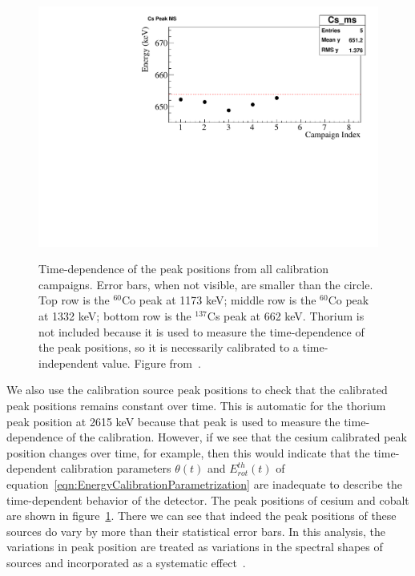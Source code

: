 \begin{figure}
\begin{center}
\includegraphics[keepaspectratio=true,width=.49\textwidth]{Cs_ms.pdf}
\end{center}
\renewcommand{\baselinestretch}{1}
\small\normalsize
\begin{quote}
\caption{Time-dependence of the peak positions from all calibration campaigns.  Error bars, when not visible, are smaller than the circle.  Top row is the $^{60}$Co peak at 1173 keV; middle row is the $^{60}$Co peak at 1332 keV; bottom row is the $^{137}$Cs peak at 662 keV.  Thorium is not included because it is used to measure the time-dependence of the peak positions, so it is necessarily calibrated to a time-independent value.  Figure from~\cite{EnergyDocumentRun2ab}.}
\label{fig:CalibPeakPosTimeDep}
\end{quote}
\end{figure}
\renewcommand{\baselinestretch}{2}
\small\normalsize

We also use the calibration source peak positions to check that the calibrated peak positions remains constant over time.  This is automatic for the thorium peak position at 2615 keV because that peak is used to measure the time-dependence of the calibration.  However, if we see that the cesium calibrated peak position changes over time, for example, then this would indicate that the time-dependent calibration parameters $\theta(t)$ and $E^{th}_{rot}(t)$ of equation~\ref{eqn:EnergyCalibrationParametrization} are inadequate to describe the time-dependent behavior of the detector.  The peak positions of cesium and cobalt are shown in figure~\ref{fig:CalibPeakPosTimeDep}.  There we can see that indeed the peak positions of these sources do vary by more than their statistical error bars.  In this analysis, the variations in peak position are treated as variations in the spectral shapes of sources and incorporated as a systematic effect~\cite{EnergyDocumentRun2ab,FittingDocument}.

